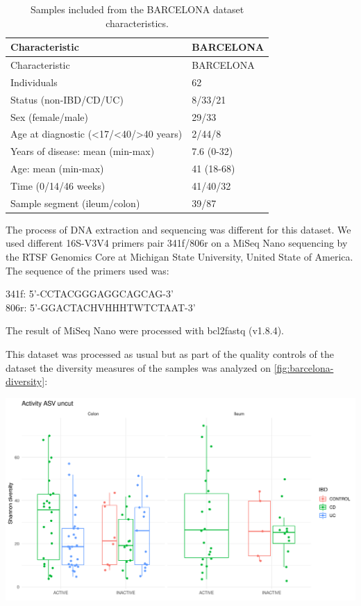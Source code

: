 \documentclass[
  12pt,
  a4paper,
  twoside,
  openright]{book}
\let\origfigure\figure
\let\endorigfigure\endfigure
\renewenvironment{figure}[1][2] {
    \expandafter\origfigure\expandafter[!ht]
} {
    \endorigfigure
}
\begin{document}
\begin{longtable}[]{@{}ll@{}}
\caption{\label{tab:BARCELONA} Samples included from the BARCELONA dataset characteristics.}\tabularnewline
\toprule
Characteristic & BARCELONA \\
\midrule
\endfirsthead
\toprule
Characteristic & BARCELONA \\
\midrule
\endhead
Individuals & 62 \\
Status (non-IBD/CD/UC) & 8/33/21 \\
Sex (female/male) & 29/33 \\
Age at diagnostic (\textless17/\textless40/\textgreater40 years) & 2/44/8 \\
Years of disease: mean (min-max) & 7.6 (0-32) \\
Age: mean (min-max) & 41 (18-68) \\
Time (0/14/46 weeks) & 41/40/32 \\
Sample segment (ileum/colon) & 39/87 \\
\bottomrule
\end{longtable}

The process of DNA extraction and sequencing was different for this dataset.
We used different 16S-V3V4 primers pair 341f/806r on a MiSeq Nano sequencing by the RTSF Genomics Core at Michigan State University, United State of America.
The sequence of the primers used was:

341f: 5'-CCTACGGGAGGCAGCAG-3'\\
806r: 5'-GGACTACHVHHHTWTCTAAT-3'

The result of MiSeq Nano were processed with bcl2fastq (v1.8.4).

This dataset was processed as usual but as part of the quality controls of the dataset the diversity measures of the samples was analyzed on \ref{fig:barcelona-diversity}:

\begin{figure}
\includegraphics[width=1\linewidth]{images/barcelona-diversity} \caption[Diversity indices of Barcelona according to the location and disease status.]{Diversity indices of Barcelona according to the location and disease status. There is a lot of diversity between different groups but importantly the control samples overlap with the patients with inflammatory bowel disease.}\label{fig:barcelona-diversity}
\end{figure}
\end{document}
